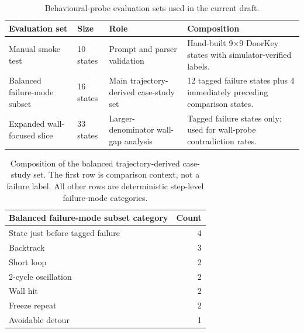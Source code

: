 \begin{table}[h]
\centering
\small
\begin{tabular}{p{3.3cm} p{1.4cm} p{4.3cm} p{5.0cm}}
\toprule
Evaluation set & Size & Role & Composition \\
\midrule
Manual smoke test & 10 states & Prompt and parser validation & Hand-built 9$\times$9 DoorKey states with simulator-verified labels. \\
Balanced failure-mode subset & 16 states & Main trajectory-derived case-study set & 12 tagged failure states plus 4 immediately preceding comparison states. \\
Expanded wall-focused slice & 33 states & Larger-denominator wall-gap analysis & Tagged failure states only; used for wall-probe contradiction rates. \\
\bottomrule
\end{tabular}
\caption{Behavioural-probe evaluation sets used in the current draft.}
\label{tab:bp-datasets}
\end{table}

\begin{table}[h]
\centering
\small
\begin{tabular}{lr}
\toprule
Balanced failure-mode subset category & Count \\
\midrule
State just before tagged failure & 4 \\
Backtrack & 3 \\
Short loop & 2 \\
2-cycle oscillation & 2 \\
Wall hit & 2 \\
Freeze repeat & 2 \\
Avoidable detour & 1 \\
\bottomrule
\end{tabular}
\caption{Composition of the balanced trajectory-derived case-study set. The first row is
comparison context, not a failure label. All other rows are deterministic step-level
failure-mode categories.}
\label{tab:bp-failure-categories}
\end{table}


